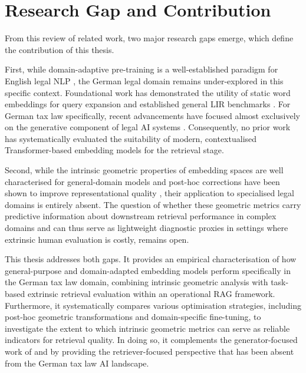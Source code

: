 \section{Research Gap and Contribution}

From this review of related work, two major research gaps emerge, which define the contribution of this thesis.

First, while domain-adaptive pre-training is a well-established paradigm for English legal \ac{NLP} \cite{chalkidis-etal-2020-legal, niklaus_2024_multilegalpile}, the German legal domain remains under-explored in this specific context. Foundational work has demonstrated the utility of static word embeddings for query expansion \cite{landthaler_improving_2019} and established general \ac{LIR} benchmarks \cite{bönisch2025finding,wrzalik_gerdalir_2021}. For German tax law specifically, recent advancements have focused almost exclusively on the generative component of legal \ac{AI} systems \cite{wind2026steuerllm, luketina2025using}. Consequently, no prior work has systematically evaluated the suitability of modern, contextualised Transformer-based embedding models for the retrieval stage.

Second, while the intrinsic geometric properties of embedding spaces are well characterised for general-domain models \cite{ethayarajh-2019-contextual,wang-isola-2020-contrastive} and post-hoc corrections have been shown to improve representational quality \cite{Li_2020_Sentence,su2021whitening}, their application to specialised legal domains is entirely absent. The question of whether these geometric metrics carry predictive information about downstream retrieval performance in complex domains and can thus serve as lightweight diagnostic proxies in settings where extrinsic human evaluation is costly, remains open.

This thesis addresses both gaps. It provides an empirical characterisation of how general-purpose and domain-adapted embedding models perform specifically in the German tax law domain, combining intrinsic geometric analysis with task-based extrinsic retrieval evaluation within an operational \ac{RAG} framework. Furthermore, it systematically compares various optimisation strategies, including post-hoc geometric transformations and domain-specific fine-tuning, to investigate the extent to which intrinsic geometric metrics can serve as reliable indicators for retrieval quality. In doing so, it complements the generator-focused work of \citet{wind2026steuerllm} and \citet{luketina2025using} by providing the retriever-focused perspective that has been absent from the German tax law \ac{AI} landscape.


